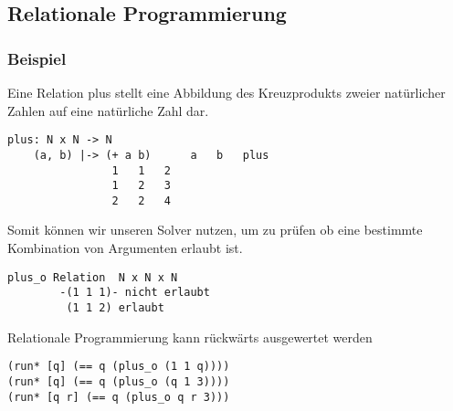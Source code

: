 \subsection{Relationale Programmierung}



\subsubsection{Beispiel}

Eine Relation plus stellt eine Abbildung des Kreuzprodukts zweier natürlicher Zahlen auf eine natürliche Zahl dar.

\begin{lstlisting}
plus: N x N -> N
    (a, b) |-> (+ a b)		a   b   plus
				1   1   2
				1   2   3
				2   2   4
\end{lstlisting}

Somit können wir unseren Solver nutzen, um zu prüfen ob eine bestimmte Kombination von Argumenten erlaubt ist.
\begin{lstlisting}
plus_o Relation	 N x N x N
		-(1 1 1)- nicht erlaubt
		 (1 1 2) erlaubt
\end{lstlisting}

Relationale Programmierung kann rückwärts ausgewertet werden

\begin{lstlisting}
(run* [q] (== q (plus_o (1 1 q))))
(run* [q] (== q (plus_o (q 1 3))))
(run* [q r] (== q (plus_o q r 3)))
\end{lstlisting}

